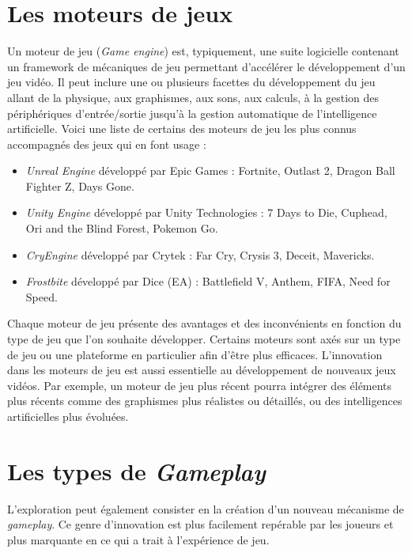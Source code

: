 \section{Les moteurs de jeux}
Un moteur de jeu (\emph{Game engine}) est, typiquement, une suite logicielle contenant un framework de mécaniques de jeu permettant d'accélérer le développement d'un jeu vidéo. Il peut inclure une ou plusieurs facettes du développement du jeu allant de la physique, aux graphismes, aux sons, aux calculs, à la gestion des périphériques d'entrée/sortie jusqu'à la gestion automatique de l'intelligence artificielle. Voici une liste de certains des moteurs de jeu les plus connus accompagnés des jeux qui en font usage : 
\begin{itemize}
    \item \emph{Unreal Engine} \cite{UnrealEngine} développé par Epic Games : Fortnite, Outlast 2, Dragon Ball Fighter Z, Days Gone.
    \item \emph{Unity Engine} \cite{UnityEngine} développé par Unity Technologies : 7 Days to Die, Cuphead, Ori and the Blind Forest, Pokemon Go.
    \item \emph{CryEngine} \cite{CryEngine} développé par Crytek : Far Cry, Crysis 3, Deceit, Mavericks.
    \item \emph{Frostbite} \cite{FrostbiteEngine} développé par Dice (EA) : Battlefield V, Anthem, FIFA, Need for Speed.
\end{itemize}

Chaque moteur de jeu présente des avantages et des inconvénients en fonction du type de jeu que l'on souhaite développer. Certains moteurs sont axés sur un type de jeu ou une plateforme en particulier afin d'être plus efficaces. 
L'innovation dans les moteurs de jeu est aussi essentielle au développement de nouveaux jeux vidéos. 
Par exemple, un moteur de jeu plus récent pourra intégrer des éléments plus récents comme des graphismes plus réalistes ou détaillés, ou des intelligences artificielles plus évoluées.

\section{Les types de \emph{Gameplay}}
L'exploration peut également consister en la création d'un nouveau mécanisme de \emph{gameplay}. Ce genre d'innovation est plus facilement repérable par les joueurs et plus marquante en ce qui a trait \`a l'expérience de jeu. 

